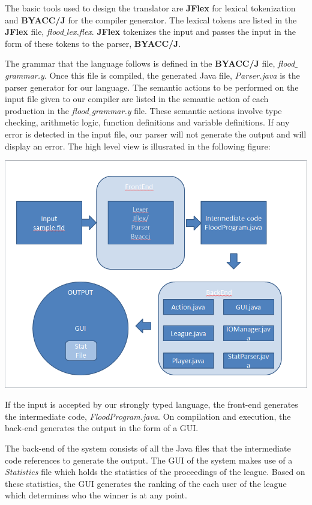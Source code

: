 \documentclass[12pt]{report}
\begin{document}
The basic tools used to design the translator are \textbf{JFlex} for lexical tokenization and \textbf{BYACC/J} for the compiler generator. The lexical tokens are listed in the \textbf{JFlex} file, \textit{flood$\_$lex.flex}. \textbf{JFlex} tokenizes the input and passes the input in the form of these tokens to the parser, \textbf{BYACC/J}.

The grammar that the language follows is defined in the \textbf{BYACC/J} file, \textit{flood$\_$grammar.y}. Once this file is compiled, the generated Java file, \textit{Parser.java} is the parser generator for our language. The semantic actions to be performed on the input file given to our compiler are listed in the semantic action of each production in the \textit{flood$\_$grammar.y} file. These semantic actions involve type checking, arithmetic logic, function definitions and variable definitions. If any error is detected in the input file, our parser will not generate the output and will display an error. The high level view is illusrated in the following figure:

\includegraphics[scale=0.7]{system_architecture.png}

If the input is accepted by our strongly typed language, the front-end generates the intermediate code, \textit{FloodProgram.java}. On compilation and execution, the back-end generates the output in the form of a GUI.

The back-end of the system consists of all the Java files that the intermediate code references to generate the output. The GUI of the system makes use of a \textit{Statistics} file which holds the statistics of the proceedings of the league. Based on these statistics, the GUI generates the ranking of the each user of the league which determines who the winner is at any point.
\end{document}
